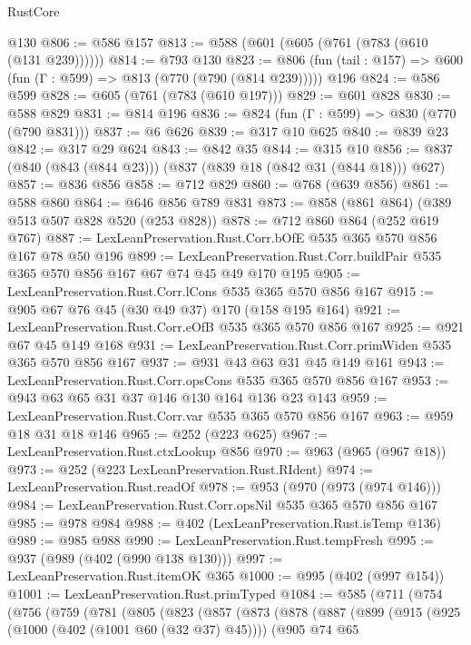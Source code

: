 \begin{lexlean}{RustCore}
\begin{coremodule}
    @130
@806 := @586 @157
@813 := @588 (@601 (@605 (@761 (@783 (@610 (@131 @239))))))
@814 := @793 @130
@823 := @806 (fun (tail : @157) => @600 (fun (Γ : @599) => @813 (@770 (@790 (@814 @239))))) @196
@824 := @586 @599
@828 := @605 (@761 (@783 (@610 @197)))
@829 := @601 @828
@830 := @588 @829
@831 := @814 @196
@836 := @824 (fun (Γ : @599) => @830 (@770 (@790 @831)))
@837 := @6 @626
@839 := @317 @10 @625
@840 := @839 @23
@842 := @317 @29 @624
@843 := @842 @35
@844 := @315 @10
@856 := @837 (@840 (@843 (@844 @23))) (@837 (@839 @18 (@842 @31 (@844 @18))) @627)
@857 := @836 @856
@858 := @712 @829
@860 := @768 (@639 @856)
@861 := @588 @860
@864 := @646 @856 @789 @831
@873 := @858 (@861 @864) (@389 @513 @507 @828 @520 (@253 @828))
@878 := @712 @860 @864 (@252 @619 @767)
@887 := LexLeanPreservation.Rust.Corr.bOfE @535 @365 @570 @856 @167 @78 @50 @196
@899 := LexLeanPreservation.Rust.Corr.buildPair @535 @365 @570 @856 @167 @67 @74 @45 @49 @170 @195
@905 := LexLeanPreservation.Rust.Corr.lCons @535 @365 @570 @856 @167
@915 := @905 @67 @76 @45 (@30 @49 @37) @170 (@158 @195 @164)
@921 := LexLeanPreservation.Rust.Corr.eOfB @535 @365 @570 @856 @167
@925 := @921 @67 @45 @149 @168
@931 := LexLeanPreservation.Rust.Corr.primWiden @535 @365 @570 @856 @167
@937 := @931 @43 @63 @31 @45 @149 @161
@943 := LexLeanPreservation.Rust.Corr.opsCons @535 @365 @570 @856 @167
@953 := @943 @63 @65 @31 @37 @146 @130 @164 @136 @23 @143
@959 := LexLeanPreservation.Rust.Corr.var @535 @365 @570 @856 @167
@963 := @959 @18 @31 @18 @146
@965 := @252 (@223 @625)
@967 := LexLeanPreservation.Rust.ctxLookup @856
@970 := @963 (@965 (@967 @18))
@973 := @252 (@223 LexLeanPreservation.Rust.RIdent)
@974 := LexLeanPreservation.Rust.readOf
@978 := @953 (@970 (@973 (@974 @146)))
@984 := LexLeanPreservation.Rust.Corr.opsNil @535 @365 @570 @856 @167
@985 := @978 @984
@988 := @402 (LexLeanPreservation.Rust.isTemp @136)
@989 := @985 @988
@990 := LexLeanPreservation.Rust.tempFresh
@995 := @937 (@989 (@402 (@990 @138 @130)))
@997 := LexLeanPreservation.Rust.itemOK @365
@1000 := @995 (@402 (@997 @154))
@1001 := LexLeanPreservation.Rust.primTyped
@1084 := @585
    (@711
      (@754
        (@756
          (@759
            (@781
              (@805
                (@823
                  (@857
                    (@873
                      (@878
                        (@887
                          (@899
                            (@915
                              (@925 (@1000 (@402 (@1001 @60 (@32 @37) @45))))
                              (@905
                                @74
                                @65

\end{coremodule}
\end{lexlean}
